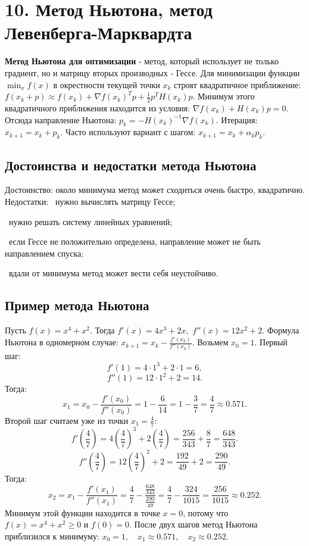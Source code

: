 \documentclass[12pt,a4paper]{article}
\begin{document}
\section{10. Метод Ньютона, метод Левенберга-Марквардта}
\textbf{Метод Ньютона для оптимизации} - метод, который использует не только градиент, но и матрицу вторых производных - Гессе.
Для минимизации функции $\min_x f(x)$
в окрестности текущей точки $x_k$ строят квадратичное приближение: $f(x_k+p)\approx f(x_k)+\nabla f(x_k)^Tp+\frac12p^T H(x_k)p.$
Минимум этого квадратичного приближения находится из условия: $\nabla f(x_k)+H(x_k)p=0.$
Отсюда направление Ньютона: $p_k=-H(x_k)^{-1}\nabla f(x_k).$
Итерация: $x_{k+1}=x_k+p_k.$
Часто используют вариант с шагом: $x_{k+1}=x_k+\alpha_k p_k.$
\subsection{Достоинства и недостатки метода Ньютона}
Достоинство: около минимума метод может сходиться очень быстро, квадратично.
Недостатки:
\noindent\textbullet\ нужно вычислять матрицу Гессе;\par
\noindent\textbullet\ нужно решать систему линейных уравнений;\par
\noindent\textbullet\ если Гессе не положительно определена, направление может не быть направлением спуска;\par
\noindent\textbullet\ вдали от минимума метод может вести себя неустойчиво.\par
\subsection{Пример метода Ньютона}
Пусть $f(x)=x^4+x^2.$
Тогда $f'(x)=4x^3+2x,$ $f''(x)=12x^2+2.$
Формула Ньютона в одномерном случае: $x_{k+1}=x_k-\frac{f'(x_k)}{f''(x_k)}.$
Возьмем $x_0=1.$
Первый шаг:
\[
f'(1)=4\cdot 1^3+2\cdot 1=6,
\]
\[
f''(1)=12\cdot 1^2+2=14.
\]
Тогда:
\[
x_1=x_0-\frac{f'(x_0)}{f''(x_0)}
=1-\frac{6}{14}
=1-\frac{3}{7}
=\frac{4}{7}\approx 0.571.
\]
Второй шаг считаем уже из точки $x_1=\frac{4}{7}$:
\[
f'\left(\frac{4}{7}\right)
=4\left(\frac{4}{7}\right)^3+2\left(\frac{4}{7}\right)
=\frac{256}{343}+\frac{8}{7}
=\frac{648}{343}.
\]
\[
f''\left(\frac{4}{7}\right)
=12\left(\frac{4}{7}\right)^2+2
=\frac{192}{49}+2
=\frac{290}{49}.
\]
Тогда:
\[
x_2=x_1-\frac{f'(x_1)}{f''(x_1)}
=\frac{4}{7}-\frac{\frac{648}{343}}{\frac{290}{49}}
=\frac{4}{7}-\frac{324}{1015}
=\frac{256}{1015}
\approx 0.252.
\]
Минимум этой функции находится в точке $x=0$, потому что $f(x)=x^4+x^2\ge 0$ и $f(0)=0.$ После двух шагов метод Ньютона приблизился к минимуму: $x_0=1,\quad x_1\approx 0.571,\quad x_2\approx 0.252.$
\end{document}
